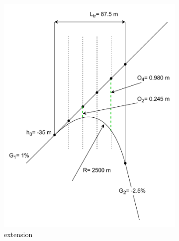\documentclass{bcrre_exam}
\begin{document}
\begin{figure}[p]
    \begin{subfigure}[b]{0.48\textwidth}
        \centering
        \includegraphics[width=\textwidth]{images/track-alignment-worksheet-vertical-curve-extension.drawio.pdf}
        \caption{extension}
        \label{fig:vertical-curve-extension}
    \end{subfigure}
    \hfill
    \begin{subfigure}[b]{0.48\textwidth}
        \centering

\end{subfigure}
\end{figure}
\end{document}
